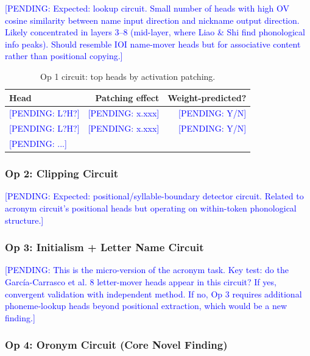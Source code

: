 \documentclass[11pt,a4paper]{article}
\newcommand{\PENDING}[1]{\textcolor{blue}{[PENDING: #1]}}
\begin{document}
\PENDING{Expected: lookup circuit. Small number of heads with high OV cosine
similarity between name input direction and nickname output direction. Likely
concentrated in layers 3--8 (mid-layer, where Liao \& Shi find phonological
info peaks). Should resemble IOI name-mover heads but for associative content
rather than positional copying.}

\begin{table}[h!]
\centering
\caption{Op 1 circuit: top heads by activation patching.}
\small
\begin{tabular}{lrr}
\toprule
\textbf{Head} & \textbf{Patching effect} & \textbf{Weight-predicted?} \\
\midrule
\PENDING{L?H?} & \PENDING{x.xxx} & \PENDING{Y/N} \\
\PENDING{L?H?} & \PENDING{x.xxx} & \PENDING{Y/N} \\
\PENDING{...}   &                  &                \\
\bottomrule
\end{tabular}
\end{table}

\subsubsection{Op 2: Clipping Circuit}

\PENDING{Expected: positional/syllable-boundary detector circuit. Related to
acronym circuit's positional heads but operating on within-token phonological
structure.}

\subsubsection{Op 3: Initialism + Letter Name Circuit}

\PENDING{This is the micro-version of the acronym task. Key test: do the
Garc\'ia-Carrasco et al. 8 letter-mover heads appear in this circuit?
If yes, convergent validation with independent method.
If no, Op 3 requires additional phoneme-lookup heads beyond positional
extraction, which would be a new finding.}

\subsubsection{Op 4: Oronym Circuit (Core Novel Finding)}
\end{document}
